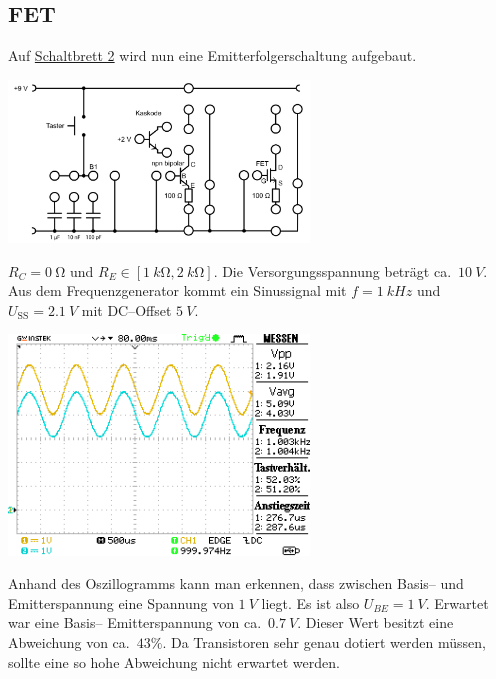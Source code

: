\documentclass[10pt]{article}
\newenvironment{Figure}
  {\par\medskip\noindent\minipage{\linewidth}}
  {\endminipage\par\medskip}
\begin{document}
\begin{multicols}{2}
        \subsection{FET}
        Auf \hyperref[fig:schaltbrett_2]{Schaltbrett 2} wird nun eine Emitterfolgerschaltung aufgebaut.
        \begin{Figure}
                \centering
                \includegraphics[width=0.6\textwidth]{schaltbrett_2.png}
                 \label{fig:schaltbrett_2}
        \end{Figure}
        $R_C=\SI{0}{\ohm}$ und $R_E \in \left[\SI{1}{k\ohm},\SI{2}{k\ohm}\right]$. 
        Die Versorgungsspannung beträgt ca.\ $\SI{10}{V}$.
        Aus dem Frequenzgenerator kommt ein Sinussignal mit $f=\SI{1}{kHz}$ und $U_{\text{SS}}=\SI{2.1}{V}$ mit DC--Offset $\SI{5}{V}$.
        \begin{Figure}
                \centering
                \includegraphics[width=0.6\textwidth]{data/DS0011.png}
        \end{Figure}
        Anhand des Oszillogramms kann man erkennen, dass zwischen Basis-- und Emitterspannung eine Spannung von $\SI{1}{V}$ liegt.
        Es ist also $U_{BE}=\SI{1}{V}$.
        Erwartet war eine Basis-- Emitterspannung von ca.\ $\SI{0.7}{V}$.
        Dieser Wert besitzt eine Abweichung von ca.\ $43\%$.
        Da Transistoren sehr genau dotiert werden müssen, sollte eine so hohe Abweichung nicht erwartet werden.

\end{multicols}
\end{document}
